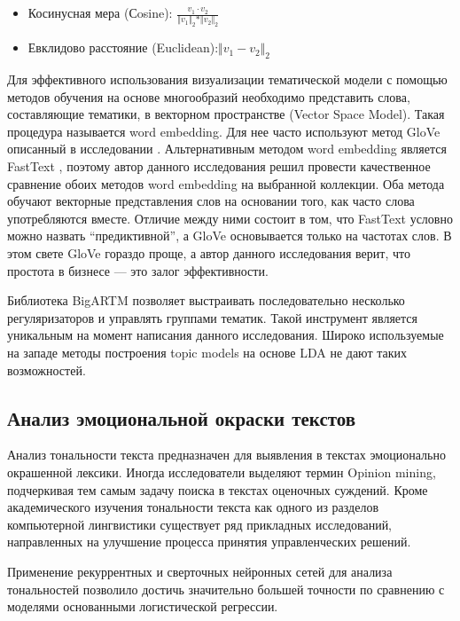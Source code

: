 \begin{itemize}
\item 	Косинусная мера (Сosine): $ \frac{v_1 \cdot v_2}{\Vert v_1 \Vert_2 * \Vert v_2 \Vert_2 } $
\item 	Евклидово расстояние (Euclidean):$ \Vert v_1 - v_2 \Vert_2$
\end{itemize}

Для эффективного использования визуализации тематической модели с помощью методов обучения на основе многообразий необходимо представить слова, составляющие тематики, в векторном пространстве (Vector Space Model). 
Такая процедура называется word embedding. 
Для нее часто используют метод GloVe описанный в исследовании \cite{pennington2014glove}. 
Альтернативным методом word embedding является FastText \cite{joulin2016bag}, поэтому автор данного исследования решил провести качественное сравнение обоих методов word embedding на выбранной коллекции. 
Оба метода обучают векторные представления слов на основании того, как часто слова употребляются вместе. 
Отличие между ними состоит в том, что FastText условно можно назвать ``предиктивной'', а GloVe основывается только на частотах слов. 
В этом свете GloVe гораздо проще, а автор данного исследования верит, что простота в бизнесе — это залог эффективности.

Библиотека BigARTM \cite{ianina2017multi} позволяет выстраивать последовательно несколько регуляризаторов и управлять группами тематик. 
Такой инструмент является уникальным на момент написания данного исследования. 
Широко используемые на западе методы построения topic models на основе LDA не дают таких возможностей.

\subsection{Анализ эмоциональной окраски текстов}
Анализ тональности текста предназначен для выявления в текстах эмоционально окрашенной лексики. 
Иногда исследователи выделяют термин Opinion mining, подчеркивая тем самым задачу поиска в текстах оценочных суждений. 
Кроме академического изучения тональности текста как одного из разделов компьютерной лингвистики существует ряд прикладных исследований, направленных на улучшение процесса принятия управленческих решений.

Применение рекуррентных и сверточных нейронных сетей для анализа тональностей позволило достичь значительно большей точности по сравнению с моделями основанными логистической регрессии.


